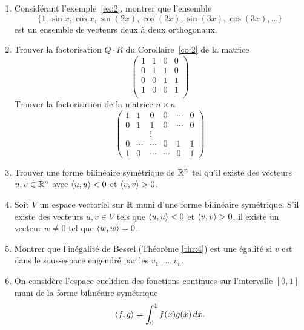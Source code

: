 \begin{enumerate}
\item Considérant l'exemple~\ref{ex:2}, montrer que l'ensemble 
  \begin{displaymath}
    \{1,\sin x, \cos x, \sin(2x), \cos(2x), \sin(3x), \cos(3x), \dots\}
  \end{displaymath}
 est un ensemble de 
vecteurs deux à deux orthogonaux. 
\item Trouver la factorisation $Q\cdot R$  du Corollaire~\ref{co:2} de la matrice 
  \begin{displaymath}
    \begin{pmatrix}
      1 & 1 & 0 &0 \\
      0& 1 & 1 & 0\\
      0 & 0 & 1 & 1\\
      1 & 0 & 0 & 1\\
    \end{pmatrix}
  \end{displaymath}
  Trouver la factorisation de la matrice $n\times n$ 
  \begin{displaymath}
    \begin{pmatrix}
      1 & 1 & 0 & 0 & \cdots & 0\\
      0 & 1 & 1 & 0 & \cdots & 0 \\
      && \vdots &&\\
      0 & \cdots & \cdots&0& 1 & 1\\
      1 & 0 & \cdots &\cdots & 0 & 1
    \end{pmatrix}
  \end{displaymath}
\item Trouver une forme bilinéaire symétrique de $\mathbb{R}^n$ tel qu'il existe des vecteurs $u,v \in \mathbb{R}^n$ avec $\langle {u,u} \rangle<0$ et $\langle {v,v} \rangle>0$. 
\item Soit $V$ un espace vectoriel sur $\mathbb{R}$ muni d'une forme bilinéaire symétrique. S'il existe des vecteurs $u,v \in V$ tels que $\langle {u,u} \rangle<0$ et $\langle {v,v} \rangle>0$, il existe un vecteur $w \neq 0$ tel que $\langle {w,w} \rangle=0$. 
\item Montrer que l'inégalité de Bessel (Théorème \ref{thr:4}) est une égalité si $v$ est dans le sous-espace engendré par les $v_1,\dots,v_n$. 
\item On considère l'espace euclidien des fonctions continues sur l'intervalle $[0,1]$ muni de la forme bilinéaire symétrique 
  \begin{displaymath}
    \langle {f,g} \rangle = \int_0^1 f(x)g(x) \, dx. 
  \end{displaymath}
  \begin{enumerate}[i)]

\end{enumerate}
\end{enumerate}
